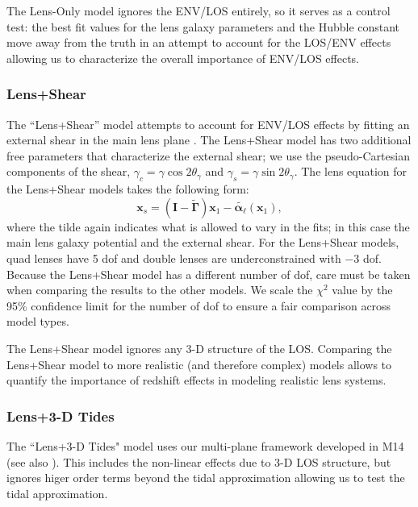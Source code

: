 \documentclass{emulateapj}
\newcommand\I[0]{\mathbf{I}}
\newcommand\GammaMat[0]{\boldsymbol{\Gamma}}
\newcommand\x[0]{\mathbf{x}}
\newcommand\al[0]{\boldsymbol{\alpha}}
\begin{document}
The Lens-Only model ignores the ENV/LOS entirely, so it serves as a control test: the best fit values for the lens galaxy parameters and the Hubble constant move away from the truth in an attempt to account for the LOS/ENV effects allowing us to characterize the overall importance of ENV/LOS effects.

\subsubsection{Lens+Shear}
The ``Lens+Shear'' model attempts to account for ENV/LOS effects by fitting an external shear in the main lens plane \citep[e.g.,][]{Suyu13}. The Lens+Shear model has two additional free parameters that characterize the external shear; we use the pseudo-Cartesian components of the shear, $\gamma_c = \gamma \cos 2\theta_\gamma$ and $\gamma_s = \gamma \sin 2\theta_\gamma$.
The lens equation for the Lens+Shear models takes the following form:
\begin{equation}
\x_s = (\I - \tilde{\GammaMat}) \x_1 - \tilde{\al_\ell}(\x_1),
\end{equation}
where the tilde again indicates what is allowed to vary in the fits; in this case the main lens galaxy potential and the external shear.
For the Lens+Shear models, quad lenses have 5 dof and double lenses are underconstrained with $-3$ dof.
Because the Lens+Shear model has a different number of dof, care must be taken when comparing the results to the other models. We scale the $\chi^2$ value by the 95\% confidence limit for the number of dof to ensure a fair comparison across model types.

The Lens+Shear model ignores any 3-D structure of the LOS. Comparing the Lens+Shear model to more realistic (and therefore complex) models allows to quantify the importance of redshift effects in modeling realistic lens systems.


\subsubsection{Lens+3-D Tides}
The ``Lens+3-D Tides" model uses our multi-plane framework developed in M14 (see also \citealt{Schneider97}). This includes the non-linear effects due to 3-D LOS structure, but ignores higer order terms beyond the tidal approximation allowing us to test the tidal approximation.
\end{document}
